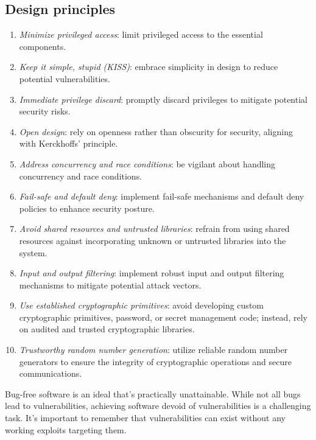 \subsection{Design principles}
\begin{enumerate}
    \item \textit{Minimize privileged access}: limit privileged access to the essential components.
    \item \textit{Keep it simple, stupid (KISS)}: embrace simplicity in design to reduce potential vulnerabilities.
    \item \textit{Immediate privilege discard}: promptly discard privileges to mitigate potential security risks.
    \item \textit{Open design}: rely on openness rather than obscurity for security, aligning with Kerckhoffs' principle.
    \item \textit{Address concurrency and race conditions}: be vigilant about handling concurrency and race conditions.
    \item \textit{Fail-safe and default deny}: implement fail-safe mechanisms and default deny policies to enhance security posture.
    \item \textit{Avoid shared resources and untrusted libraries}: refrain from using shared resources against incorporating unknown or untrusted libraries into the system.
    \item \textit{Input and output filtering}: implement robust input and output filtering mechanisms to mitigate potential attack vectors.
    \item \textit{Use established cryptographic primitives}: avoid developing custom cryptographic primitives, password, or secret management code; instead, rely on audited and trusted cryptographic libraries.
    \item \textit{Trustworthy random number generation}: utilize reliable random number generators to ensure the integrity of cryptographic operations and secure communications.
\end{enumerate}

Bug-free software is an ideal that's practically unattainable. 
While not all bugs lead to vulnerabilities, achieving software devoid of vulnerabilities is a challenging task.
It's important to remember that vulnerabilities can exist without any working exploits targeting them.